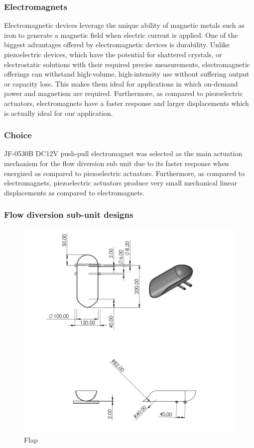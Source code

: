 \subsubsection{Electromagnets}
Electromagnetic devices leverage the unique ability of magnetic metals such as iron to generate a magnetic field when electric current is applied. One of the biggest advantages offered by electromagnetic devices is durability. Unlike piezoelectric devices, which have the potential for shattered crystals, or electrostatic solutions with their required precise measurements, electromagnetic offerings can withstand high-volume, high-intensity use without suffering output or capacity loss\cite{yasumoto2018electromagnetic}. This makes them ideal for applications in which on-demand power and magnetism are required. Furthermore, as compared to piezoelectric actuators, electromagnets have a faster response and larger displacements which is actually ideal for our application.
\subsubsection{Choice}
JF-0530B DC12V push-pull electromagnet was selected as the main actuation mechanism for the flow diversion sub unit due to its faster response when energized as compared to piezoelectric actuators. Furthermore, as compared to electromagnets, piezoelectric actuators produce very small mechanical linear displacements as compared to electromagnets.
\clearpage
\subsubsection{Flow diversion sub-unit designs}
\begin{figure}[H]
\includegraphics[width=0.9\linewidth]{Figures/flap.png}
\centering
\caption{Flap }
\label{fig:flap}
\end{figure}

